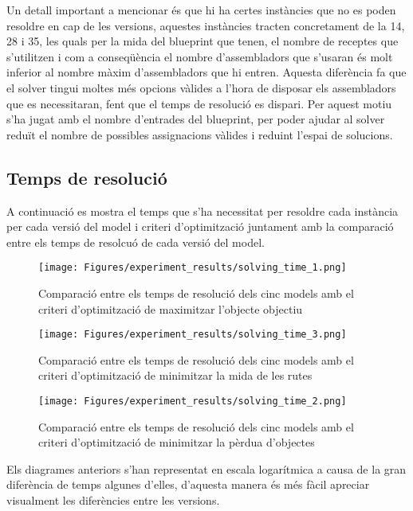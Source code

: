Un detall important a mencionar és que hi ha certes instàncies que no es poden resoldre en cap de les versions, aquestes instàncies tracten concretament de la 14, 28 i 35, les quals per la mida del blueprint que tenen, el nombre de receptes que s'utilitzen i com a conseqüència el nombre d'assembladors que s'usaran és molt inferior al nombre màxim d'assembladors que hi entren. Aquesta diferència fa que el solver tingui moltes més opcions vàlides a l'hora de disposar els assembladors que es necessitaran, fent que el temps de resolució es dispari. Per aquest motiu s'ha jugat amb el nombre d'entrades del blueprint, per poder ajudar al solver reduït el nombre de possibles assignacions vàlides i reduint l'espai de solucions.

\subsection{Temps de resolució}
A continuació es mostra el temps que s'ha necessitat per resoldre cada instància per cada versió del model i criteri d'optimització juntament amb la comparació entre els temps de resolcuó de cada versió del model.

\begin{figure}[H]
    \centering
    \texttt{[image: Figures/experiment\_results/solving\_time\_1.png]}
    \caption{Comparació entre els temps de resolució dels cinc models amb el criteri d'optimització de maximitzar l'objecte objectiu}
    \label{fig:opt1_times}
\end{figure}

\begin{figure}[H]
    \centering
    \texttt{[image: Figures/experiment\_results/solving\_time\_3.png]}
    \caption{Comparació entre els temps de resolució dels cinc models amb el criteri d'optimització de minimitzar la mida de les rutes}
    \label{fig:opt2_times}
\end{figure}

\begin{figure}[H]
    \centering
    \texttt{[image: Figures/experiment\_results/solving\_time\_2.png]}
    \caption{Comparació entre els temps de resolució dels cinc models amb el criteri d'optimització de minimitzar la pèrdua d'objectes}
    \label{fig:opt3_times}
\end{figure}

Els diagrames anteriors s'han representat en escala logarítmica a causa de la gran diferència de temps algunes d'elles, d'aquesta manera és més fàcil apreciar visualment les diferències entre les versions.\\

